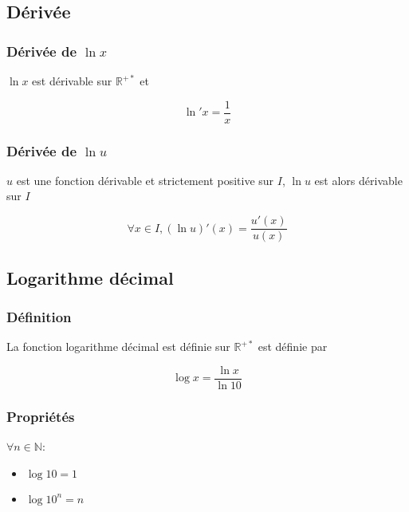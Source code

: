 \documentclass[a4paper]{article}
\begin{document}
\subsection{Dérivée}
\subsubsection{Dérivée de $\ln{x}$}

{$\ln{x}$ est dérivable sur $\mathbb{R}^{+*}$ et}

\[\ln{}\prime x = \frac{1}{x}\]

\subsubsection{Dérivée de $\ln{u}$}

{$u$ est une fonction dérivable et strictement positive sur $I$, $\ln{u}$ est alors dérivable sur $I$}

\[\forall x \in I, \left(\ln{u}\right)\prime(x)=\frac{u\prime(x)}{u(x)}\]

\subsection{Logarithme décimal}
\subsubsection{Définition}

{La fonction logarithme décimal est définie sur $\mathbb{R}^{+*}$ est définie par}

\[\log{x}=\frac{\ln{x}}{\ln{10}}\]

\subsubsection{Propriétés}

{$\forall n \in \mathbb{N}$:}

\begin{multicols}{2}
	\begin{itemize}
  		\item{$\log{10}=1$}
  		\item{$\log{10^n}=n$}
	\end{itemize}
\end{multicols}
\end{document}
